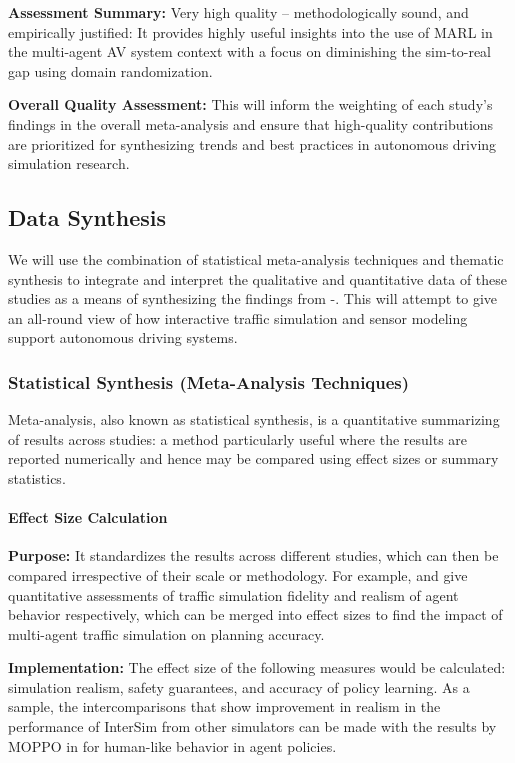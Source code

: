 \documentclass[lettersize,journal]{IEEEtran}
\begin{document}
\textbf{Assessment Summary:} Very high quality – methodologically sound, and empirically justified: It provides highly useful insights into the use of MARL in the multi-agent AV system context with a focus on diminishing the sim-to-real gap using domain randomization.

\textbf{Overall Quality Assessment:} This will inform the weighting of each study's findings in the overall meta-analysis and ensure that high-quality contributions are prioritized for synthesizing trends and best practices in autonomous driving simulation research.


\subsection{Data Synthesis}

We will use the combination of statistical meta-analysis techniques and thematic synthesis to integrate and interpret the qualitative and quantitative data of these studies as a means of synthesizing the findings from \cite{ref61}-\cite{ref65}. This will attempt to give an all-round view of how interactive traffic simulation and sensor modeling support autonomous driving systems.

\subsubsection{Statistical Synthesis (Meta-Analysis Techniques)}

Meta-analysis, also known as statistical synthesis, is a quantitative summarizing of results across studies: a method particularly useful where the results are reported numerically and hence may be compared using effect sizes or summary statistics.

\paragraph{Effect Size Calculation}

\textbf{Purpose:} It standardizes the results across different studies, which can then be compared irrespective of their scale or methodology. For example, \cite{ref61} and \cite{ref62} give quantitative assessments of traffic simulation fidelity and realism of agent behavior respectively, which can be merged into effect sizes to find the impact of multi-agent traffic simulation on planning accuracy.

\textbf{Implementation:} The effect size of the following measures would be calculated: simulation realism, safety guarantees, and accuracy of policy learning. As a sample, the intercomparisons that show improvement in realism in the performance of InterSim from other simulators can be made with the results by MOPPO in \cite{ref62} for human-like behavior in agent policies.
\end{document}
